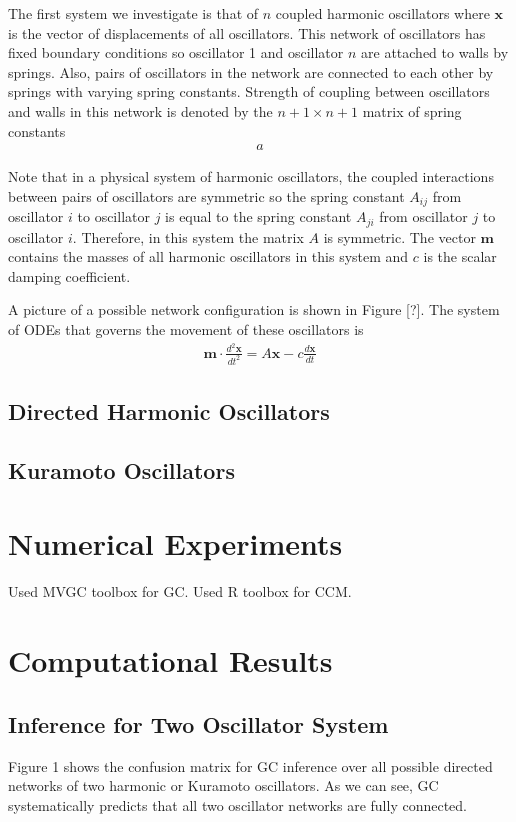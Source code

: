 \documentclass[]{article}
\begin{document}
The first system we investigate is that of $n$ coupled harmonic oscillators where $\mathbf{x}$ is the vector of displacements of all oscillators. This network of oscillators has fixed boundary conditions so oscillator 1 and oscillator $n$ are attached to walls by springs. Also, pairs of oscillators in the network are connected to each other by springs with varying spring constants. Strength of coupling between oscillators and walls in this network is denoted by the $n + 1 \times n + 1$ matrix of spring constants
\begin{align*}
a
\end{align*}

Note that in a physical system of harmonic oscillators, the coupled interactions between pairs of oscillators are symmetric so the spring constant $A_{ij}$ from oscillator $i$ to oscillator $j$ is equal to the spring constant $A_{ji}$ from oscillator $j$ to oscillator $i$. Therefore, in this system the matrix $A$ is symmetric. The vector $\mathbf{m}$ contains the masses of all harmonic oscillators in this system and $c$ is the scalar damping coefficient.

A picture of a possible network configuration is shown in Figure [?]. The system of ODEs that governs the movement of these oscillators is
\begin{align*}
\mathbf{m} \cdot \frac{d^2\mathbf{x}}{dt^2} = A\mathbf{x} - c\frac{d\mathbf{x}}{dt}
\end{align*}

\subsection{Directed Harmonic Oscillators}

\subsection{Kuramoto Oscillators}


\section{Numerical Experiments}
Used MVGC toolbox for GC. Used R toolbox for CCM.


\section{Computational Results}
\subsection{Inference for Two Oscillator System}
Figure 1 shows the confusion matrix for GC inference over all possible directed networks of two harmonic or Kuramoto oscillators. As we can see, GC systematically predicts that all two oscillator networks are fully connected.
\end{document}
